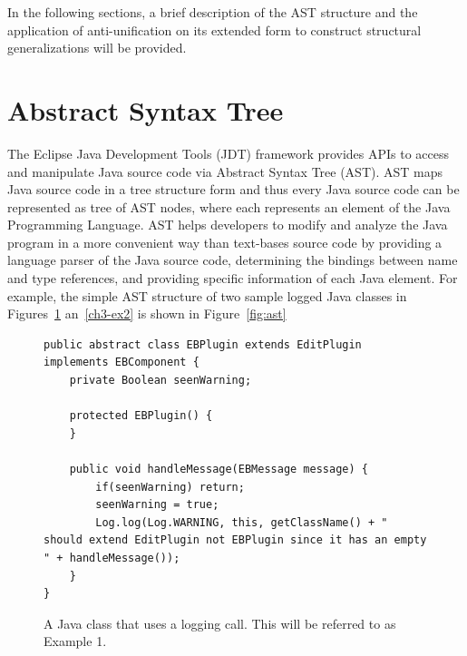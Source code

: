 In the following sections, a brief description of the AST structure and the application of anti-unification on its extended form to construct structural generalizations will be provided.

\section{Abstract Syntax Tree}   \label{AST}

The Eclipse Java Development Tools (JDT) framework provides APIs to access and manipulate Java source code via Abstract Syntax Tree (AST). AST maps Java source code in a tree structure form and thus every Java source code can be represented as tree of AST nodes, where each represents an element of the Java Programming Language. AST helps developers to modify and analyze the Java program in a more convenient way than text-bases source code by providing a language parser of the Java source code, determining the bindings between name and type references, and providing specific information of each Java element. For example, the simple AST structure of two sample logged Java classes in Figures~\ref{ch3-ex1} an~\ref{ch3-ex2} is shown in Figure~\ref{fig:ast}


\begin{figure}[t]
\def\baselinestretch{1}
\begin{lstlisting}
public abstract class EBPlugin extends EditPlugin implements EBComponent {
    private Boolean seenWarning;

    protected EBPlugin() {
    }

    public void handleMessage(EBMessage message) {
        if(seenWarning) return;
        seenWarning = true;
        Log.log(Log.WARNING, this, getClassName() + " should extend EditPlugin not EBPlugin since it has an empty " + handleMessage());
    }
}
\end{lstlisting}
\caption{A Java class that uses a logging call. This will be referred to as Example 1.\label{ch3-ex1}}
\end{figure}


